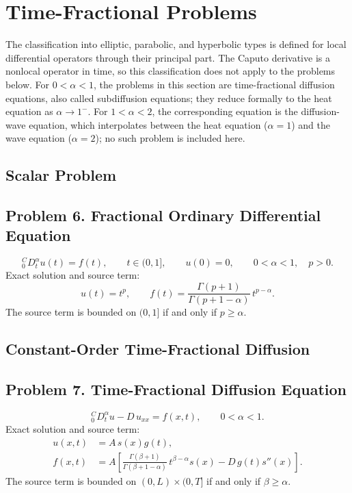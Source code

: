 \documentclass[11pt]{article}
\newcommand{\Caputo}[1]{{}^{C}_{0}D_t^{#1}}
\begin{document}
\section{Time-Fractional Problems}

The classification into elliptic, parabolic, and hyperbolic types is
defined for local differential operators through their principal part.
The Caputo derivative is a nonlocal operator in time, so this
classification does not apply to the problems below. For $0<\alpha<1$,
the problems in this section are time-fractional diffusion equations,
also called subdiffusion equations; they reduce formally to the heat
equation as $\alpha\to1^-$. For $1<\alpha<2$, the corresponding
equation is the diffusion-wave equation, which interpolates between the
heat equation ($\alpha=1$) and the wave equation ($\alpha=2$); no such
problem is included here.

\subsection{Scalar Problem}

\subsection*{Problem 6. Fractional Ordinary Differential Equation}

\[
\boxed{\Caputo{\alpha}u(t)=f(t)},
\qquad t\in(0,1],
\qquad u(0)=0,
\qquad 0<\alpha<1,
\quad p>0.
\]
Exact solution and source term:
\[
u(t)=t^p,
\qquad
f(t)=
\frac{\Gamma(p+1)}{\Gamma(p+1-\alpha)}\,
t^{p-\alpha}.
\]
The source term is bounded on $(0,1]$ if and only if $p\ge\alpha$.

\subsection{Constant-Order Time-Fractional Diffusion}

\subsection*{Problem 7. Time-Fractional Diffusion Equation}

\[
\boxed{\Caputo{\alpha}u-D\,u_{xx}=f(x,t)},
\qquad 0<\alpha<1.
\]
Exact solution and source term:
\[
\begin{aligned}
u(x,t)&=A\,s(x)g(t),\\
f(x,t)&=A\left[
\frac{\Gamma(\beta+1)}{\Gamma(\beta+1-\alpha)}\,
t^{\beta-\alpha}s(x)-D\,g(t)s''(x)
\right].
\end{aligned}
\]
The source term is bounded on $(0,L)\times(0,T]$ if and only if
$\beta\ge\alpha$.
\end{document}
